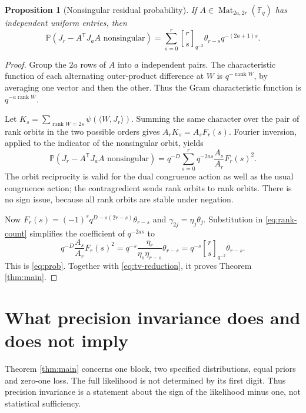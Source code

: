 \documentclass[11pt]{article}
\newtheorem{proposition}[theorem]{Proposition}
\newcommand{\F}{\mathbb F}
\newcommand{\Pp}{\mathbb P}
\newcommand{\Mat}{\operatorname{Mat}}
\newcommand{\rank}{\operatorname{rank}}
\newcommand{\qbin}[3]{\genfrac{[}{]}{0pt}{}{#1}{#2}_{#3}}
\begin{document}
\begin{proposition}[Nonsingular residual probability]\label{prop:prob}
If $A\in\Mat_{2a,2r}(\F_q)$ has independent uniform entries, then
\begin{equation}\label{eq:prob}
 \Pp(J_r-A^{\mathsf T}J_aA\text{ nonsingular})
 =\sum_{s=0}^r\qbin r{s}{q^{-2}}\theta_{r-s}q^{-(2a+1)s}.
\end{equation}
\end{proposition}
\begin{proof}
Group the $2a$ rows of $A$ into $a$ independent pairs. The characteristic function of each alternating outer-product difference at $W$ is $q^{-\rank W}$, by averaging one vector and then the other. Thus the Gram characteristic function is $q^{-a\rank W}$.

Let $K_s=\sum_{\rank W=2s}\psi(\langle W,J_r\rangle)$. Summing the same character over the pair of rank orbits in the two possible orders gives
$A_rK_s=A_sF_r(s)$. Fourier inversion, applied to the indicator of the nonsingular orbit, yields
\[
 \Pp(J_r-A^{\mathsf T}J_aA\text{ nonsingular})
 =q^{-D}\sum_{s=0}^r q^{-2as}\frac{A_s}{A_r}F_r(s)^2.
\]
The orbit reciprocity is valid for the dual congruence action as well as the usual congruence action; the contragredient sends rank orbits to rank orbits. There is no sign issue, because all rank orbits are stable under negation.

Now $F_r(s)=(-1)^s q^{D-s(2r-s)}\theta_{r-s}$ and $\gamma_{2j}=\eta_j\theta_j$. Substitution in \eqref{eq:rank-count} simplifies the coefficient of $q^{-2as}$ to
\[
 q^{-D}\frac{A_s}{A_r}F_r(s)^2
 =q^{-s}\frac{\eta_r}{\eta_s\eta_{r-s}}\theta_{r-s}
 =q^{-s}\qbin r{s}{q^{-2}}\theta_{r-s}.
\]
This is \eqref{eq:prob}. Together with \eqref{eq:tv-reduction}, it proves Theorem \ref{thm:main}.
\end{proof}

\section{What precision invariance does and does not imply}
Theorem \ref{thm:main} concerns one block, two specified distributions, equal priors and zero-one loss. The full likelihood is not determined by its first digit. Thus precision invariance is a statement about the sign of the likelihood minus one, not statistical sufficiency.
\end{document}
